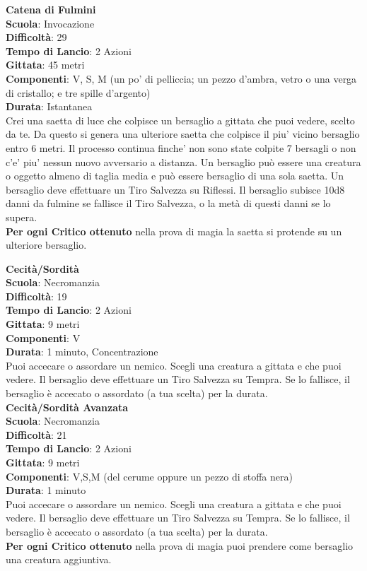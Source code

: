 \begin{multicols}{2}
\medskip\textbf{Catena di Fulmini}\\
\textbf{Scuola}: Invocazione\\
\textbf{Difficoltà}: 29\\
\textbf{Tempo di Lancio}: 2 Azioni\\
\textbf{Gittata}: 45 metri\\
\textbf{Componenti}: V, S, M (un po' di pelliccia; un pezzo d'ambra, vetro o una verga di cristallo; e tre spille d'argento)\\
\textbf{Durata}: Istantanea\\
Crei una saetta di luce che colpisce un bersaglio a gittata che puoi vedere, scelto da te. Da questo si genera una ulteriore saetta che colpisce il piu' vicino bersaglio entro 6 metri. Il processo continua finche' non sono state colpite 7 bersagli o non c'e' piu' nessun nuovo avversario a distanza. Un bersaglio può essere una creatura o oggetto almeno di taglia media e può essere bersaglio di una sola saetta. Un bersaglio deve effettuare un Tiro Salvezza su Riflessi. Il bersaglio subisce 10d8 danni da fulmine se fallisce il Tiro Salvezza, o la metà di questi danni se lo supera.\\
\textbf{Per ogni Critico ottenuto} nella prova di magia la saetta si protende su un ulteriore bersaglio.

\medskip\textbf{Cecità/Sordità}\\
\textbf{Scuola}: Necromanzia\\
\textbf{Difficoltà}: 19\\
\textbf{Tempo di Lancio}: 2 Azioni\\
\textbf{Gittata}: 9 metri\\
\textbf{Componenti}: V\\
\textbf{Durata}: 1 minuto, Concentrazione\\
Puoi accecare o assordare un nemico. Scegli una creatura a gittata e che puoi vedere. Il bersaglio deve effettuare un Tiro Salvezza su Tempra. Se lo fallisce, il bersaglio è accecato o assordato (a tua scelta) per la durata.\\

\medskip\textbf{Cecità/Sordità Avanzata}\\
\textbf{Scuola}: Necromanzia\\
\textbf{Difficoltà}: 21\\
\textbf{Tempo di Lancio}: 2 Azioni\\
\textbf{Gittata}: 9 metri\\
\textbf{Componenti}: V,S,M (del cerume oppure un pezzo di stoffa nera)\\
\textbf{Durata}: 1 minuto\\
Puoi accecare o assordare un nemico. Scegli una creatura a gittata e che puoi vedere. Il bersaglio deve effettuare un Tiro Salvezza su Tempra. Se lo fallisce, il bersaglio è accecato o assordato (a tua scelta) per la durata.\\
\textbf{Per ogni Critico ottenuto} nella prova di magia puoi prendere come bersaglio una creatura aggiuntiva.


\end{multicols}
